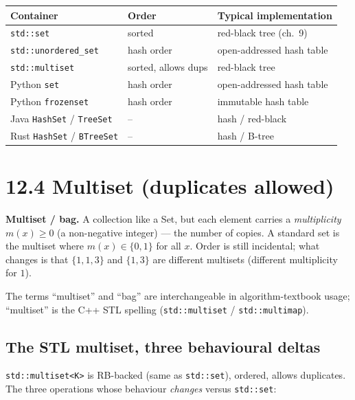 \documentclass[11pt]{article}
\begin{document}
\begin{center}
\begin{tabular}{lll}
\hline
Container & Order & Typical implementation \\
\hline
\texttt{std::set} & sorted & red-black tree (ch.\ 9) \\
\texttt{std::unordered\_set} & hash order & open-addressed hash table \\
\texttt{std::multiset} & sorted, allows dups & red-black tree \\
Python \texttt{set} & hash order & open-addressed hash table \\
Python \texttt{frozenset} & hash order & immutable hash table \\
Java \texttt{HashSet} / \texttt{TreeSet} & -- & hash / red-black \\
Rust \texttt{HashSet} / \texttt{BTreeSet} & -- & hash / B-tree \\
\hline
\end{tabular}
\end{center}

\section{12.4 Multiset (duplicates allowed)}

\begin{defnbox}
\textbf{Multiset / bag.} A collection like a Set, but each element
carries a \emph{multiplicity} $m(x) \ge 0$ (a non-negative integer) ---
the number of copies. A standard set is the multiset where
$m(x) \in \{0, 1\}$ for all $x$. Order is still incidental; what
changes is that $\{1, 1, 3\}$ and $\{1, 3\}$ are different multisets
(different multiplicity for $1$).
\end{defnbox}

The terms ``multiset'' and ``bag'' are interchangeable in
algorithm-textbook usage; ``multiset'' is the C++ STL spelling
(\texttt{std::multiset} / \texttt{std::multimap}).

\subsection*{The STL multiset, three behavioural deltas}

\texttt{std::multiset<K>} is RB-backed (same as \texttt{std::set}),
ordered, allows duplicates. The three operations whose behaviour
\emph{changes} versus \texttt{std::set}:
\end{document}
